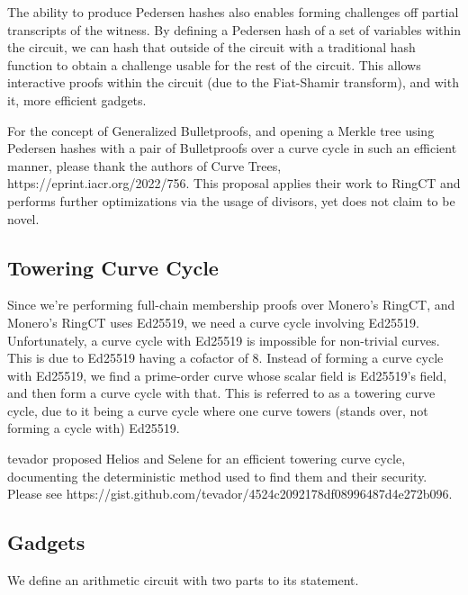 \documentclass[]{article}
\begin{document}
The ability to produce Pedersen hashes also enables forming challenges off partial transcripts of the witness. By defining a Pedersen hash of a set of variables within the circuit, we can hash that outside of the circuit with a traditional hash function to obtain a challenge usable for the rest of the circuit. This allows interactive proofs within the circuit (due to the Fiat-Shamir transform), and with it, more efficient gadgets.

For the concept of Generalized Bulletproofs, and opening a Merkle tree using Pedersen hashes with a pair of Bulletproofs over a curve cycle in such an efficient manner, please thank the authors of Curve Trees, https://eprint.iacr.org/2022/756. This proposal applies their work to RingCT and performs further optimizations via the usage of divisors, yet does not claim to be novel.

\subsection{Towering Curve Cycle}

Since we're performing full-chain membership proofs over Monero's RingCT, and Monero's RingCT uses Ed25519, we need a curve cycle involving Ed25519. Unfortunately, a curve cycle with Ed25519 is impossible for non-trivial curves. This is due to Ed25519 having a cofactor of 8. Instead of forming a curve cycle with Ed25519, we find a prime-order curve whose scalar field is Ed25519's field, and then form a curve cycle with that. This is referred to as a towering curve cycle, due to it being a curve cycle where one curve towers (stands over, not forming a cycle with) Ed25519.

tevador proposed Helios and Selene for an efficient towering curve cycle, documenting the deterministic method used to find them and their security. Please see https://gist.github.com/tevador/4524c2092178df08996487d4e272b096.

\newpage

\subsection{Gadgets}

We define an arithmetic circuit with two parts to its statement.
\end{document}

